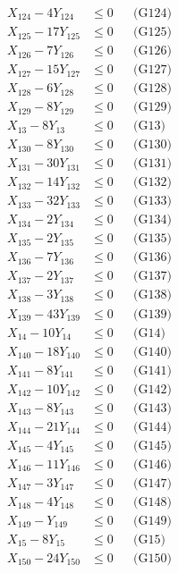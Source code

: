 \documentclass[a4paper,10pt]{article}
\begin{document}
{\begin{align}
X_{124} - 4Y_{124} &\leq 0 && \text{(G124)} \\
X_{125} - 17Y_{125} &\leq 0 && \text{(G125)} \\
X_{126} - 7Y_{126} &\leq 0 && \text{(G126)} \\
X_{127} - 15Y_{127} &\leq 0 && \text{(G127)} \\
X_{128} - 6Y_{128} &\leq 0 && \text{(G128)} \\
X_{129} - 8Y_{129} &\leq 0 && \text{(G129)} \\
X_{13} - 8Y_{13} &\leq 0 && \text{(G13)} \\
X_{130} - 8Y_{130} &\leq 0 && \text{(G130)} \\
X_{131} - 30Y_{131} &\leq 0 && \text{(G131)} \\
X_{132} - 14Y_{132} &\leq 0 && \text{(G132)} \\
X_{133} - 32Y_{133} &\leq 0 && \text{(G133)} \\
\allowbreak
X_{134} - 2Y_{134} &\leq 0 && \text{(G134)} \\
X_{135} - 2Y_{135} &\leq 0 && \text{(G135)} \\
X_{136} - 7Y_{136} &\leq 0 && \text{(G136)} \\
X_{137} - 2Y_{137} &\leq 0 && \text{(G137)} \\
X_{138} - 3Y_{138} &\leq 0 && \text{(G138)} \\
X_{139} - 43Y_{139} &\leq 0 && \text{(G139)} \\
X_{14} - 10Y_{14} &\leq 0 && \text{(G14)} \\
X_{140} - 18Y_{140} &\leq 0 && \text{(G140)} \\
X_{141} - 8Y_{141} &\leq 0 && \text{(G141)} \\
X_{142} - 10Y_{142} &\leq 0 && \text{(G142)} \\
X_{143} - 8Y_{143} &\leq 0 && \text{(G143)} \\
X_{144} - 21Y_{144} &\leq 0 && \text{(G144)} \\
X_{145} - 4Y_{145} &\leq 0 && \text{(G145)} \\
X_{146} - 11Y_{146} &\leq 0 && \text{(G146)} \\
X_{147} - 3Y_{147} &\leq 0 && \text{(G147)} \\
X_{148} - 4Y_{148} &\leq 0 && \text{(G148)} \\
X_{149} - Y_{149} &\leq 0 && \text{(G149)} \\
X_{15} - 8Y_{15} &\leq 0 && \text{(G15)} \\
X_{150} - 24Y_{150} &\leq 0 && \text{(G150)} \\

\end{align}}
\end{document}

